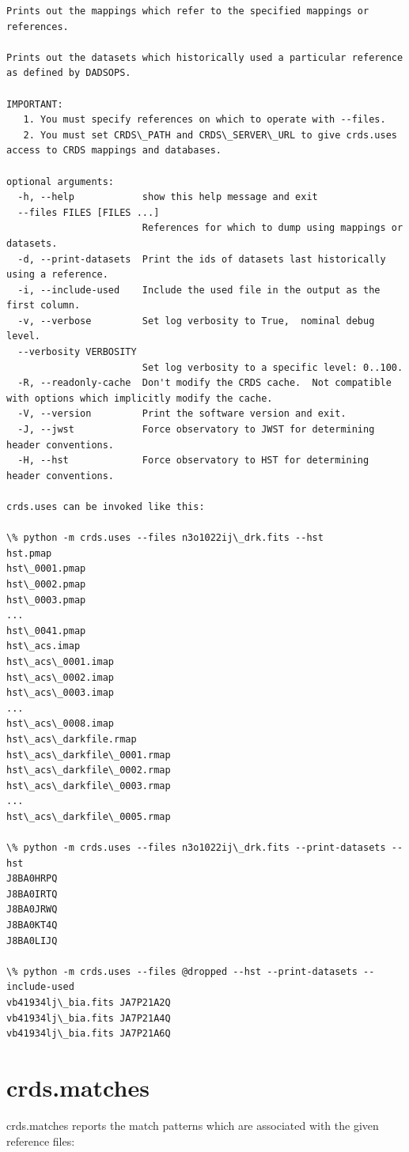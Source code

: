 \documentclass[letterpaper,10pt,english]{sphinxmanual}
\begin{document}
\begin{Verbatim}[commandchars=\\\{\}]
Prints out the mappings which refer to the specified mappings or references.

Prints out the datasets which historically used a particular reference as defined by DADSOPS.

IMPORTANT:
   1. You must specify references on which to operate with --files.
   2. You must set CRDS\_PATH and CRDS\_SERVER\_URL to give crds.uses access to CRDS mappings and databases.

optional arguments:
  -h, --help            show this help message and exit
  --files FILES [FILES ...]
                        References for which to dump using mappings or datasets.
  -d, --print-datasets  Print the ids of datasets last historically using a reference.
  -i, --include-used    Include the used file in the output as the first column.
  -v, --verbose         Set log verbosity to True,  nominal debug level.
  --verbosity VERBOSITY
                        Set log verbosity to a specific level: 0..100.
  -R, --readonly-cache  Don't modify the CRDS cache.  Not compatible with options which implicitly modify the cache.
  -V, --version         Print the software version and exit.
  -J, --jwst            Force observatory to JWST for determining header conventions.
  -H, --hst             Force observatory to HST for determining header conventions.

crds.uses can be invoked like this:

\% python -m crds.uses --files n3o1022ij\_drk.fits --hst
hst.pmap
hst\_0001.pmap
hst\_0002.pmap
hst\_0003.pmap
...
hst\_0041.pmap
hst\_acs.imap
hst\_acs\_0001.imap
hst\_acs\_0002.imap
hst\_acs\_0003.imap
...
hst\_acs\_0008.imap
hst\_acs\_darkfile.rmap
hst\_acs\_darkfile\_0001.rmap
hst\_acs\_darkfile\_0002.rmap
hst\_acs\_darkfile\_0003.rmap
...
hst\_acs\_darkfile\_0005.rmap

\% python -m crds.uses --files n3o1022ij\_drk.fits --print-datasets --hst
J8BA0HRPQ
J8BA0IRTQ
J8BA0JRWQ
J8BA0KT4Q
J8BA0LIJQ

\% python -m crds.uses --files @dropped --hst --print-datasets --include-used
vb41934lj\_bia.fits JA7P21A2Q
vb41934lj\_bia.fits JA7P21A4Q
vb41934lj\_bia.fits JA7P21A6Q
\end{Verbatim}


\section{crds.matches}
\label{command_line_tools:crds-matches}
crds.matches reports the match patterns which are associated with the given
reference files:
\end{document}
